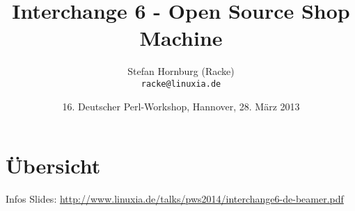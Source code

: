 \usepackage[utf8]{inputenc}
\usepackage[T1]{fontenc}
\usepackage{mathptmx}
\usepackage[scaled=.90]{helvet}
\usepackage{courier}
\usepackage{caption}
\captionsetup{labelformat=empty,labelsep=none}
\usepackage{verbatim}
\usepackage{hyperref}
\usepackage{listings}
\lstset{language=Perl,basicstyle=\normalsize,tabsize=3,showstringspaces=false}

\title{Interchange 6 - Open Source Shop Machine}
\author[racke]{Stefan Hornburg (Racke)\\ \texttt{racke@linuxia.de}}
\date{16. Deutscher Perl-Workshop, Hannover, 28. März 2013}


\maketitle{}

\begin{frame}
  \titlepage
\end{frame}

\tableofcontents

\section{Übersicht}

\begin{frame}{Infos}
Slides:
\url{http://www.linuxia.de/talks/pws2014/interchange6-de-beamer.pdf}
\end{frame}



